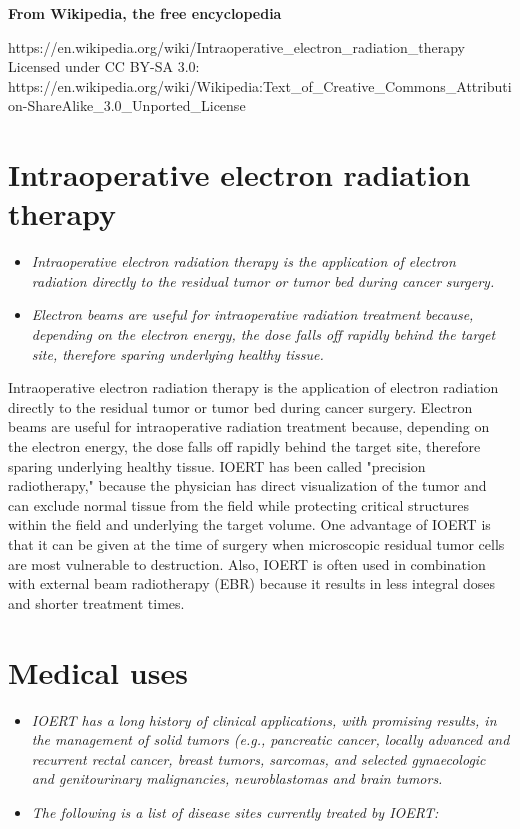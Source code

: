 \textbf{From Wikipedia, the free encyclopedia}

https://en.wikipedia.org/wiki/Intraoperative\_electron\_radiation\_therapy\\
Licensed under CC BY-SA 3.0:\\
https://en.wikipedia.org/wiki/Wikipedia:Text\_of\_Creative\_Commons\_Attribution-ShareAlike\_3.0\_Unported\_License

\section{Intraoperative electron radiation
therapy}\label{intraoperative-electron-radiation-therapy}

\begin{itemize}
\item
  \emph{Intraoperative electron radiation therapy is the application of
  electron radiation directly to the residual tumor or tumor bed during
  cancer surgery.}
\item
  \emph{Electron beams are useful for intraoperative radiation treatment
  because, depending on the electron energy, the dose falls off rapidly
  behind the target site, therefore sparing underlying healthy tissue.}
\end{itemize}

Intraoperative electron radiation therapy is the application of electron
radiation directly to the residual tumor or tumor bed during cancer
surgery. Electron beams are useful for intraoperative radiation
treatment because, depending on the electron energy, the dose falls off
rapidly behind the target site, therefore sparing underlying healthy
tissue. IOERT has been called "precision radiotherapy," because the
physician has direct visualization of the tumor and can exclude normal
tissue from the field while protecting critical structures within the
field and underlying the target volume. One advantage of IOERT is that
it can be given at the time of surgery when microscopic residual tumor
cells are most vulnerable to destruction. Also, IOERT is often used in
combination with external beam radiotherapy (EBR) because it results in
less integral doses and shorter treatment times.

\section{Medical uses}\label{medical-uses}

\begin{itemize}
\item
  \emph{IOERT has a long history of clinical applications, with
  promising results, in the management of solid tumors (e.g., pancreatic
  cancer, locally advanced and recurrent rectal cancer, breast tumors,
  sarcomas, and selected gynaecologic and genitourinary malignancies,
  neuroblastomas and brain tumors.}
\item
  \emph{The following is a list of disease sites currently treated by
  IOERT:}
\end{itemize}

